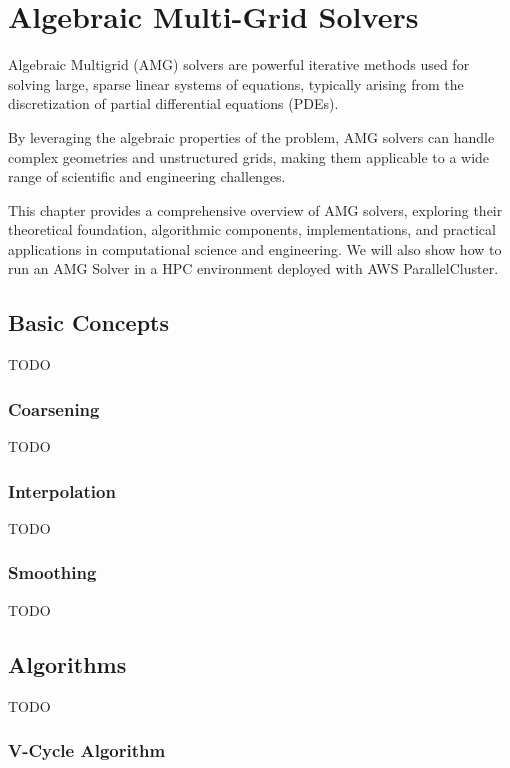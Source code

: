 

\chapter{Algebraic Multi-Grid Solvers}

Algebraic Multigrid (AMG) solvers are powerful iterative methods used for solving large, sparse linear systems of equations, typically arising from the discretization of partial differential equations (PDEs).

By leveraging the algebraic properties of the problem, AMG solvers can handle complex geometries and unstructured grids, making them applicable to a wide range of scientific and engineering challenges.

This chapter provides a comprehensive overview of AMG solvers, exploring their theoretical foundation, algorithmic components, implementations, and practical applications in computational science and engineering. 
We will also show how to run an AMG Solver in a HPC environment deployed with AWS ParallelCluster.

\section{Basic Concepts}

TODO

\subsection{Coarsening}

TODO

\subsection{Interpolation}

TODO

\subsection{Smoothing}

TODO

\section{Algorithms}

TODO

\subsection{V-Cycle Algorithm}

